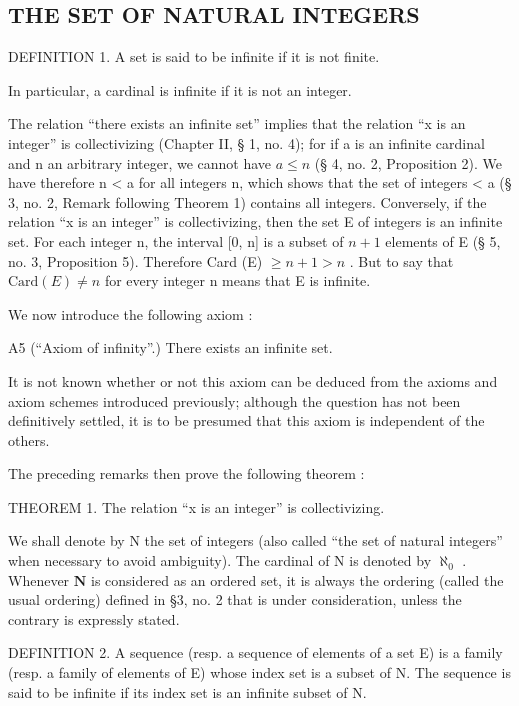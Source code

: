 \subsection{THE SET OF NATURAL INTEGERS}

DEFINITION 1. A set is said to be infinite if it is not finite.

In particular, a cardinal is infinite if it is not an integer.

The relation ``there exists an infinite set'' implies that the relation ``x is an integer'' is collectivizing (Chapter II, § 1, no. 4); for if a is an infinite cardinal and n an arbitrary integer, we cannot have \(a \leqslant n\) (§ 4, no. 2, Proposition 2). We have therefore n \textless{} a for all integers n, which shows that the set of integers \textless{} a (§ 3, no. 2, Remark following Theorem 1) contains all integers. Conversely, if the relation ``x is an integer'' is collectivizing, then the set E of integers is an infinite set. For each integer n, the interval {[}0, n{]} is a subset of \(n + 1\) elements of E (§ 5, no. 3, Proposition 5). Therefore Card (E) \(\geqslant n + 1 > n\) . But to say that \(\text{Card}(E) \neq n\) for every integer n means that E is infinite.

We now introduce the following axiom :

A5 (``Axiom of infinity''.) There exists an infinite set.

It is not known whether or not this axiom can be deduced from the axioms and axiom schemes introduced previously; although the question has not been definitively settled, it is to be presumed that this axiom is independent of the others.

The preceding remarks then prove the following theorem :

THEOREM 1. The relation ``x is an integer'' is collectivizing.

We shall denote by N the set of integers (also called ``the set of natural integers'' when necessary to avoid ambiguity). The cardinal of N is denoted by \(\aleph_0\) . Whenever \(\mathbf{N}\) is considered as an ordered set, it is always the ordering (called the usual ordering) defined in §3, no. 2 that is under consideration, unless the contrary is expressly stated.

DEFINITION 2. A sequence (resp. a sequence of elements of a set E) is a family (resp. a family of elements of E) whose index set is a subset of N. The sequence is said to be infinite if its index set is an infinite subset of N.

